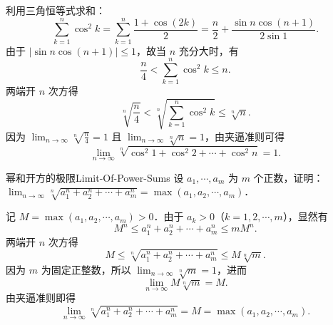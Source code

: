 \begin{solution}

    利用三角恒等式求和：
    \begin{equation}
        \sum_{k=1}^n \cos^2 k = \sum_{k=1}^n \frac{1 + \cos(2k)}{2} = \frac{n}{2} + \frac{\sin n \cos(n+1)}{2\sin 1}.
    \end{equation}
    由于 $|\sin n \cos(n+1)| \leqslant 1$，故当 $n$ 充分大时，有
    \begin{equation}
        \frac{n}{4} < \sum_{k=1}^n \cos^2 k \leqslant n.
    \end{equation}
    两端开 $n$ 次方得
    \begin{equation}
        \sqrt[n]{\frac{n}{4}} < \sqrt[n]{\sum_{k=1}^n \cos^2 k} \leqslant \sqrt[n]{n}.
    \end{equation}
    因为 $\lim_{n\to\infty} \sqrt[n]{\frac{n}{4}} = 1$ 且 $\lim_{n\to\infty} \sqrt[n]{n} = 1$，由夹逼准则可得
    \begin{equation}
        \boxed{\lim_{n\to\infty} \sqrt[n]{\cos^2 1 + \cos^2 2 + \cdots + \cos^2 n} = 1.}
    \end{equation}
\end{solution}

\begin{problem}{幂和开方的极限}{Limit-Of-Power-Sums}
    设 $a_1, \cdots, a_m$ 为 $m$ 个正数，证明：$\lim_{n\to\infty} \sqrt[n]{a_1^n + a_2^n + \cdots + a_m^n} = \max(a_1, a_2, \cdots, a_m)$．
\end{problem}

\begin{myproof}
    记 $M = \max(a_1, a_2, \cdots, a_m) > 0$．由于 $a_k > 0$（$k = 1, 2, \cdots, m$），显然有
    \begin{equation}
        M^n \leqslant a_1^n + a_2^n + \cdots + a_m^n \leqslant m M^n.
    \end{equation}
    两端开 $n$ 次方得
    \begin{equation}
        M \leqslant \sqrt[n]{a_1^n + a_2^n + \cdots + a_m^n} \leqslant M \sqrt[n]{m}.
    \end{equation}
    因为 $m$ 为固定正整数，所以 $\lim_{n\to\infty} \sqrt[n]{m} = 1$，进而
    \begin{equation}
        \lim_{n\to\infty} M \sqrt[n]{m} = M.
    \end{equation}
    由夹逼准则即得
    \begin{equation}
        \lim_{n\to\infty} \sqrt[n]{a_1^n + a_2^n + \cdots + a_m^n} = M = \max(a_1, a_2, \cdots, a_m).
    \end{equation}
\end{myproof}

